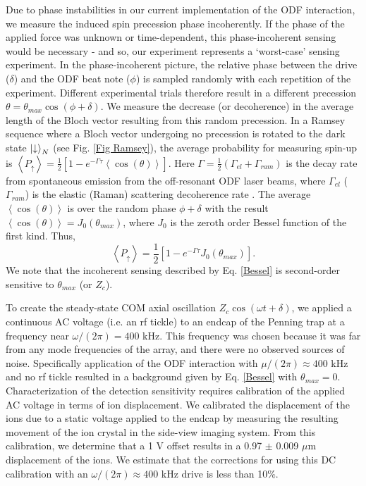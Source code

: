 \documentclass[aps,prl,twocolumn,superscriptaddress,floatfix]{revtex4-1}
\begin{document}
Due to phase instabilities in our current implementation of the ODF interaction, we measure the induced spin precession phase incoherently. If the phase of the applied force was unknown or time-dependent, this phase-incoherent sensing would be necessary - and so, our experiment represents a `worst-case' sensing experiment. In the phase-incoherent picture, the relative phase between the drive ($\delta$) and the ODF beat note ($\phi$) is sampled randomly with each repetition of the experiment. Different experimental trials therefore result in a different precession $\theta = \theta_{max} \cos(\phi+\delta)$. We measure the decrease (or decoherence) in the average length of the Bloch vector resulting from this random precession. In a Ramsey sequence where a Bloch vector undergoing no precession is rotated to the dark state $\ket{\downarrow}_N$ (see Fig. \ref{Fig Ramsey}), the average probability for measuring spin-up is $\left< P_{\uparrow} \right> = \frac{1}{2}[1-e^{-\Gamma \tau} \left<\cos(\theta)\right>]$. Here $\Gamma = \frac{1}{2}(\Gamma_{el} + \Gamma_{ram})$ is the decay rate from spontaneous emission from the off-resonant ODF laser beams, where $\Gamma_{el}$ ($\Gamma_{ram}$) is the elastic (Raman) scattering decoherence rate \citep{Uys2010}. The average $ \left< \cos(\theta) \right> $ is over the random phase $\phi+\delta$ with the result $ \left< \cos(\theta) \right> = J_0(\theta_{max}) $, where $J_0$ is the zeroth order Bessel function of the first kind. Thus,
\begin{equation}
\left< P_{\uparrow} \right> = \frac{1}{2} \left[ 1-e^{-\Gamma \tau}J_0(\theta_{max}) \right].
\label{Bessel}
\end{equation}
We note that the incoherent sensing described by Eq. \ref{Bessel} is second-order sensitive to $\theta_{max}$ (or $Z_c$).

To create the steady-state COM axial oscillation $Z_c \cos(\omega t+\delta)$, we applied a continuous AC voltage (i.e. an rf tickle) to an endcap of the Penning trap at a frequency near $\omega/(2\pi) = 400$ kHz. This frequency was chosen because it was far from any mode frequencies of the array, and there were no observed sources of noise. Specifically application of the ODF interaction with $\mu/(2\pi) \approx 400$ kHz and no rf tickle resulted in a background given by Eq. \ref{Bessel} with $\theta_{max}=0$. Characterization of the detection sensitivity requires calibration of the applied AC voltage in terms of ion displacement. We calibrated the displacement of the ions due to a static voltage applied to the endcap by measuring the resulting movement of the ion crystal in the side-view imaging system. From this calibration, we determine that a 1 V offset results in a 0.97 $\pm$ 0.009 $\mu$m displacement of the ions. We estimate that the corrections for using this DC calibration with an $\omega/(2\pi) \approx 400$ kHz drive is less than 10$\%$. 
\end{document}

